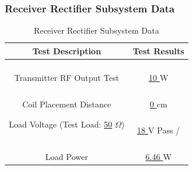 \documentclass[12pt]{article}
\begin{document}
\subsubsection{Receiver Rectifier Subsystem Data}

\hfill
\begin{table}[h!]
\centering
\caption*{Receiver Rectifier Subsystem Data}
\begin{tabular}{ | c | c | }
\hline
\textbf{Test Description} & \textbf{Test Results} \\
\hline
\parbox{0.5\linewidth}{\raggedright \hfill \\[-0.25 em]
Transmitter RF Output Test
\hfill \\[0.1 em]} &  \parbox{0.4\linewidth}{\centering \hfill \\ [0.7 em]\underline{\hspace{0.125in}
10
\hspace{0.125in}} W
\hfill \\ [0.3 em]} \\ 
\hline
\parbox{0.5\linewidth}{\raggedright \hfill \\[-0.25 em]
Coil Placement Distance
\hfill \\[0.1 em]} &  \parbox{0.4\linewidth}{\centering \hfill \\ [0.7 em]\underline{\hspace{0.125in}
0
\hspace{0.125in}} cm
\hfill \\ [0.3 em]} \\ 
\hline
\parbox{0.5\linewidth}{\raggedright \hfill \\[-0.25 em]
Load Voltage (Test Load: \underline{50} $\Omega$)
\hfill \\[0.1 em]} &  \parbox{0.4\linewidth}{\raggedright \hfill \\ [0.7 em]\underline{\hspace{0.125in}
18
\hspace{0.125in}} V 
\hspace{0.125 in}Pass \space / \space {} \hfill \\ [0.3 em]} \\ 
\hline
\parbox{0.5\linewidth}{\raggedright \hfill \\[-0.25 em]
Load Power
\hfill \\[0.1 em]} &  \parbox{0.4\linewidth}{\raggedright \hfill \\ [0.7 em]\underline{\hspace{0.125in}
6.46
\hspace{0.125in}} W
}
\end{tabular}
\end{table}
\end{document}
